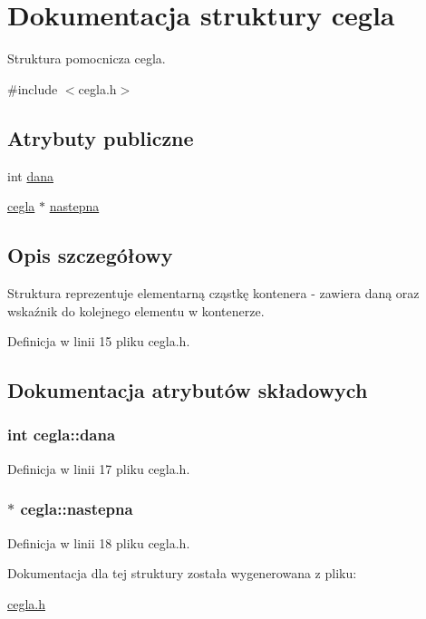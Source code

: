 \hypertarget{structcegla}{\section{Dokumentacja struktury cegla}
\label{structcegla}
}


Struktura pomocnicza cegla.  




{\ttfamily \#include $<$cegla.\-h$>$}

\subsection*{Atrybuty publiczne}
\begin{DoxyCompactItemize}
\item 
int \hyperlink{structcegla_a25ba885f5ac99791f80fd1676ce22a3a}{dana}
\item 
\hyperlink{structcegla}{cegla} $\ast$ \hyperlink{structcegla_aca5144299572d01d919e2655e447f9a8}{nastepna}
\end{DoxyCompactItemize}


\subsection{Opis szczegółowy}
Struktura reprezentuje elementarną cząstkę kontenera -\/ zawiera daną oraz wskaźnik do kolejnego elementu w kontenerze. 

Definicja w linii 15 pliku cegla.\-h.



\subsection{Dokumentacja atrybutów składowych}
\hypertarget{structcegla_a25ba885f5ac99791f80fd1676ce22a3a}{
\subsubsection[{dana}]{\setlength{\rightskip}{0pt plus 5cm}int cegla\-::dana}}\label{structcegla_a25ba885f5ac99791f80fd1676ce22a3a}


Definicja w linii 17 pliku cegla.\-h.

\hypertarget{structcegla_aca5144299572d01d919e2655e447f9a8}{
\subsubsection[{nastepna}]{$\ast$ cegla\-::nastepna}}\label{structcegla_aca5144299572d01d919e2655e447f9a8}


Definicja w linii 18 pliku cegla.\-h.



Dokumentacja dla tej struktury została wygenerowana z pliku\-:\begin{DoxyCompactItemize}
\item 
\hyperlink{cegla_8h}{cegla.\-h}\end{DoxyCompactItemize}
